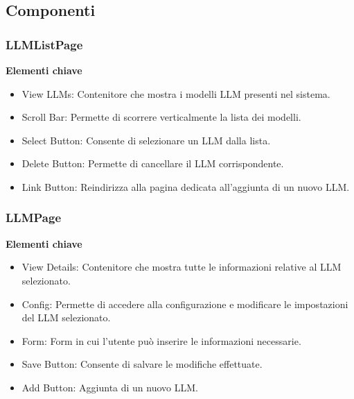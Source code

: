 \subsection{Componenti}
\label{subsec:Componenti}

\subsubsection{LLMListPage}
\textbf{Elementi chiave}
\begin{itemize}
    \item View LLMs: Contenitore che mostra i modelli LLM presenti nel sistema.
    \item Scroll Bar: Permette di scorrere verticalmente la lista dei modelli.  
    \item Select Button: Consente di selezionare un LLM dalla lista. 
    \item Delete Button: Permette di cancellare il LLM corrispondente.
    \item Link Button: Reindirizza alla pagina dedicata all'aggiunta di un nuovo LLM.
\end{itemize}

\subsubsection{LLMPage}
\textbf{Elementi chiave}
\begin{itemize}
    \item View Details: Contenitore che mostra tutte le informazioni relative al LLM selezionato.
    \item Config: Permette di accedere alla configurazione e modificare le impostazioni del LLM selezionato.
    \item Form: Form in cui l’utente può inserire le informazioni necessarie.
    \item Save Button: Consente di salvare le modifiche effettuate.
    \item Add Button: Aggiunta di un nuovo LLM.
\end{itemize}